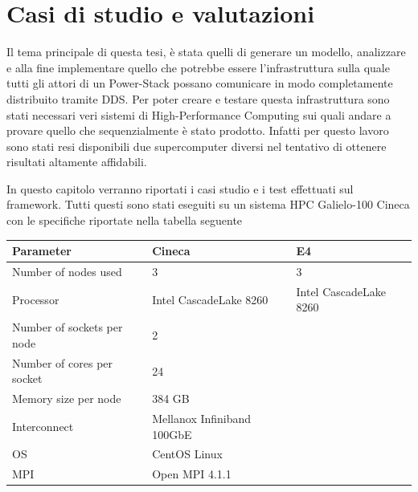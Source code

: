 \chapter{Casi di studio e valutazioni}
Il tema principale di questa tesi, è stata quelli di generare un modello, analizzare e alla fine implementare quello che potrebbe essere l'infrastruttura sulla quale tutti gli attori di un Power-Stack 
possano comunicare in modo completamente distribuito tramite DDS. Per poter creare e testare questa infrastruttura sono stati necessari veri sistemi di High-Performance Computing sui quali andare a provare quello che sequenzialmente è stato prodotto. Infatti per questo lavoro sono stati resi disponibili due supercomputer diversi nel tentativo di ottenere risultati altamente affidabili.

In questo capitolo verranno riportati i casi studio e i test effettuati sul framework. Tutti questi sono stati eseguiti su un sistema HPC Galielo-100 Cineca con le specifiche riportate nella tabella seguente

\vspace{.5cm}
\begin{center}
\begin{tabular}{l|l|l}
    \hline
    \textbf{Parameter} & \textbf{Cineca} & \textbf{E4} \\
    \hline
    Number of nodes used & 3 & 3\\
    \hline
    Processor & Intel CascadeLake 8260 & Intel CascadeLake 8260  \\
    \hline
    Number of sockets per node & 2 \\
    \hline
    Number of cores per socket & 24 \\
    \hline
    Memory size per node & 384 GB \\
    \hline
    Interconnect & Mellanox Infiniband 100GbE \\
    \hline
    OS & CentOS Linux \\ 
    \hline
    MPI & Open MPI  4.1.1 \\
    \hline
\end{tabular}
\label{table:hpc-cineca}
\end{center}

